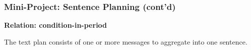 \begin{frame}
\frametitle{Mini-Project: Sentence Planning (cont'd)}


\textbf{Relation: condition-in-period}

The text plan consists of one or more messages to aggregate
into one sentence.

\vspace{12pt}

\begin{center}

\end{center}

\end{frame}
